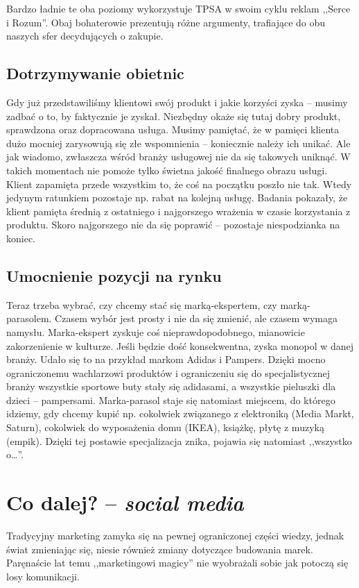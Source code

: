 \documentclass [a4paper, 11pt]{article}
\begin{document}
Bardzo ładnie te oba poziomy wykorzystuje TPSA w swoim cyklu reklam ,,Serce i Rozum''. Obaj bohaterowie prezentują różne argumenty, trafiające do obu naszych sfer decydujących o zakupie.

\subsection{Dotrzymywanie obietnic}
Gdy już przedstawiliśmy klientowi swój produkt i jakie korzyści zyska -- musimy zadbać o to, by faktycznie je zyskał. Niezbędny okaże się tutaj dobry produkt, sprawdzona oraz dopracowana usługa. Musimy pamiętać, że w pamięci klienta dużo mocniej zarysowują się złe wspomnienia -- koniecznie należy ich unikać. Ale jak wiadomo, zwłaszcza wśród branży usługowej nie da się takowych uniknąć. \cite{wyklad1} W takich momentach nie pomoże tylko świetna jakość finalnego obrazu usługi. Klient zapamięta przede wszystkim to, że coś na początku poszło nie tak. Wtedy jedynym ratunkiem pozostaje np. rabat na kolejną usługę. Badania pokazały, że klient pamięta średnią z ostatniego i najgorszego wrażenia w czasie korzystania z produktu. Skoro najgorszego nie da się poprawić -- pozostaje niespodzianka na koniec.

\subsection{Umocnienie pozycji na rynku}
Teraz trzeba wybrać, czy chcemy stać się marką-ekspertem, czy marką-parasolem. Czasem wybór jest prosty i nie da się zmienić, ale czasem wymaga namysłu. Marka-ekspert zyskuje coś nieprawdopodobnego, mianowicie zakorzenienie w kulturze. Jeśli będzie dość konsekwentna, zyska monopol w danej branży. Udało się to na przykład markom Adidas i Pampers. Dzięki mocno ograniczonemu wachlarzowi produktów i ograniczeniu się do specjalistycznej branży wszystkie sportowe buty stały się adidasami, a wszystkie pieluszki dla dzieci -- pampersami. Marka-parasol staje się natomiast miejscem, do którego idziemy, gdy chcemy kupić np. cokolwiek związanego z elektroniką (Media Markt, Saturn), cokolwiek do wyposażenia domu (IKEA), książkę, płytę z muzyką (empik). Dzięki tej postawie specjalizacja znika, pojawia się natomiast ,,wszystko o\dots''.

\section{Co dalej? -- \emph{social media}}
Tradycyjny marketing zamyka się na pewnej ograniczonej części wiedzy, jednak świat zmieniając się, niesie również zmiany dotyczące budowania marek. Paręnaście lat temu ,,marketingowi magicy'' nie wyobrażali sobie jak potoczą się losy komunikacji.
\end{document}
